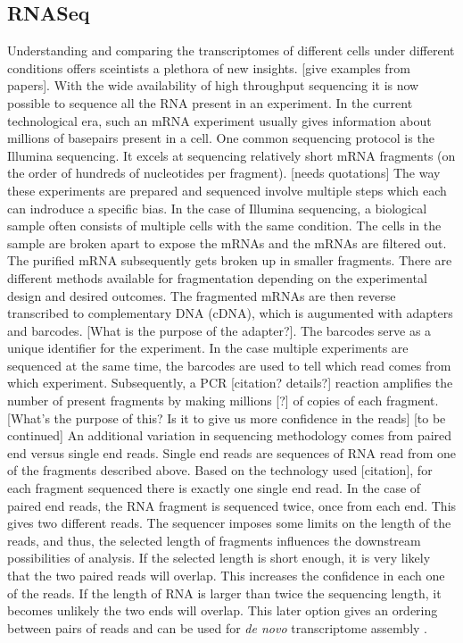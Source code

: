 \documentclass[12pt]{article}
\begin{document}
\subsection{RNASeq}
    Understanding and comparing the transcriptomes of different cells under different conditions offers sceintists a plethora of new insights. [give examples from papers]. With the wide availability of high throughput sequencing it is now possible to sequence all the RNA  present in an experiment\cite{Kukurba2015}. In the current technological era, such an mRNA experiment usually gives information about millions of basepairs present in a cell. 
    One common sequencing protocol is the Illumina sequencing. It excels at sequencing relatively short mRNA fragments (on the order of hundreds of nucleotides per fragment). [needs quotations] The way these experiments are prepared and sequenced involve multiple steps which each can indroduce a specific bias. In the case of Illumina sequencing, a biological sample often consists of multiple cells with the same condition. The cells in the sample are broken apart to expose the mRNAs and the mRNAs are filtered out. The purified mRNA subsequently gets broken up in smaller fragments. There are different methods available for fragmentation depending on the experimental design and desired outcomes. The fragmented mRNAs are then reverse transcribed to complementary DNA (cDNA), which is augumented with adapters and barcodes. [What is the purpose of the adapter?]. The barcodes serve as a unique identifier for the experiment. In the case multiple experiments are sequenced at the same time, the barcodes are used to tell which read comes from which experiment. Subsequently, a PCR [citation? details?] reaction amplifies the number of present fragments by making millions [?] of copies of each fragment. [What's the purpose of this? Is it to give us more confidence in the reads] [to be continued]   
    An additional variation in sequencing methodology comes from paired end versus single end reads. Single end reads are sequences of RNA read from one of the fragments described above. Based on the technology used [citation], for each fragment sequenced there is exactly one single end read. In the case of paired end reads, the RNA fragment is sequenced twice, once from each end. This gives two different reads. The sequencer imposes some limits on the length of the reads, and thus, the selected length of fragments influences the downstream possibilities of analysis. If the selected length is short enough, it is very likely that the two paired reads will overlap. This increases the confidence in each one of the reads. If the length of RNA is larger than twice the sequencing length, it becomes unlikely the two ends will overlap. This later option gives an ordering between pairs of reads and can be used for \textit{de novo} transcriptome assembly \cite{Hlzer2019}.  
\end{document}
